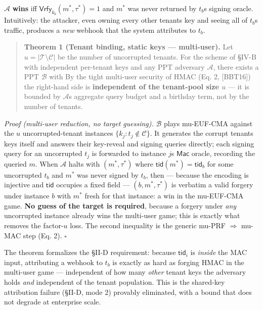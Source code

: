 \(\mathcal{A}\) \textbf{wins} iff
\(\mathsf{Vrfy}_{k_b}(m^*,\tau^*)=1\) and \(m^*\) was never returned
by \(t_b\)\textquotesingle s signing oracle. Intuitively: the attacker,
even owning every other tenant\textquotesingle s key and seeing all of
\(t_b\)\textquotesingle s traffic, produces a \emph{new} webhook that
the system attributes to \(t_b\).

\begin{quote}
\textbf{Theorem 1 (Tenant binding, static keys --- multi-user).} Let
\(u=|\mathcal{T}\setminus
\mathcal{C}|\) be the number of uncorrupted tenants. For the scheme of
§IV-B with independent per-tenant keys and any PPT adversary
\(\mathcal{A}\), there exists a PPT \(\mathcal{B}\) with
By the tight multi-user security of HMAC (Eq. 2, {[}BBT16{]}) the
right-hand side is \textbf{independent of the tenant-pool size \(u\)}
--- it is bounded by \(\mathcal{A}\)\textquotesingle s aggregate query
budget and a birthday term, not by the number of tenants.
\end{quote}

\emph{Proof (multi-user reduction, no target guessing).} \(\mathcal{B}\)
plays mu-EUF-CMA against the \(u\) uncorrupted-tenant instances
\(\{k_j : t_j\notin\mathcal{C}\}\). It generates the corrupt
tenants\textquotesingle{} keys itself and answers their key-reveal and
signing queries directly; each signing query for an uncorrupted \(t_j\)
is forwarded to instance \(j\)\textquotesingle s \(\mathsf{Mac}\)
oracle, recording the queried \(m\). When \(\mathcal{A}\) halts with
\((m^*,\tau^*)\) where \(\mathsf{tid}(m^*)=\mathsf{tid}_b\) for some
uncorrupted \(t_b\) and \(m^*\) was never signed by \(t_b\), then ---
because the encoding is injective and \(\mathsf{tid}\) occupies a fixed
field --- \((b, m^*,\tau^*)\) is verbatim a valid forgery under
instance \(b\) with \(m^*\) fresh for that instance: a win in the
mu-EUF-CMA game. \textbf{No guess of the target is required}, because a
forgery under \emph{any} uncorrupted instance already wins the
multi-user game; this is exactly what removes the factor-\(u\) loss. The
second inequality is the generic mu-PRF \(\Rightarrow\) mu-MAC step (Eq.
2). \(\square\)

The theorem formalizes the §II-D requirement: because \(\mathsf{tid}_i\)
is \emph{inside} the MAC input, attributing a webhook to \(t_b\) is
exactly as hard as forging HMAC in the multi-user game --- independent
of how many \emph{other} tenant keys the adversary holds \emph{and}
independent of the tenant population. This is the shared-key attribution
failure (§II-D, mode 2) provably eliminated, with a bound that does not
degrade at enterprise scale.

